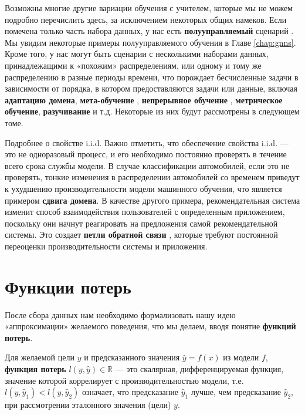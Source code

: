 Возможны многие другие вариации обучения с учителем, которые мы не можем подробно перечислить здесь, за исключением некоторых общих намеков. Если помечена только часть набора данных, у нас есть \textbf{полууправляемый} сценарий \cite{belkin2006manifold}. Мы увидим некоторые примеры полууправляемого обучения в Главе \ref{chap:gnns}. Кроме того, у нас могут быть сценарии с несколькими наборами данных, принадлежащими к «похожим» распределениям, или одному и тому же распределению в разные периоды времени, что порождает бесчисленные задачи в зависимости от порядка, в котором предоставляются задачи или данные, включая \textbf{адаптацию домена}, \textbf{мета-обучение} \cite{finn2017model}, \textbf{непрерывное обучение} \cite{parisi2019continual,biesialska2020continual}, \textbf{метрическое обучение}, \textbf{разучивание} и т.д. Некоторые из них будут рассмотрены в следующем томе.

\begin{supportbox}{Подробнее о свойстве i.i.d.}
Важно отметить, что обеспечение свойства i.i.d. — это не одноразовый процесс, и его необходимо постоянно проверять в течение всего срока службы модели. В случае классификации автомобилей, если это не проверять, тонкие изменения в распределении автомобилей со временем приведут к ухудшению производительности модели машинного обучения, что является примером \textbf{сдвига домена}. В качестве другого примера, рекомендательная система изменит способ взаимодействия пользователей с определенным приложением, поскольку они начнут реагировать на предложения самой рекомендательной системы. Это создает \textbf{петли обратной связи} \cite{cinus2022effect}, которые требуют постоянной переоценки производительности системы и приложения.
\end{supportbox}

\section{Функции потерь}
\label{sec:loss_functions}

\addclock После сбора данных нам необходимо формализовать нашу идею «аппроксимации» желаемого поведения, что мы делаем, вводя понятие \textbf{функций потерь}.

\begin{definition} \addbottle
Для желаемой цели $y$ и предсказанного значения $\hat{y}=f(x)$ из модели $f$, \textbf{функция потерь} $l(y, \hat{y}) \in \mathbb{R}$ — это скалярная, дифференцируемая функция, значение которой коррелирует с производительностью модели, т.е. $l(y, \hat{y}_1) < l(y, \hat{y}_2)$ означает, что предсказание $\hat{y}_1$ лучше, чем предсказание $\hat{y}_2$, при рассмотрении эталонного значения (цели) $y$.
\end{definition}

